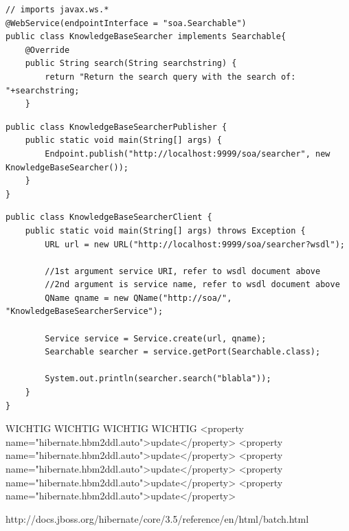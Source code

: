 \documentclass[12pt]{article}
\begin{document}
\begin{lstlisting}[caption=KnowledgeBaseSearcher class, label=KnowledgeBaseSearcher]
// imports javax.ws.*
@WebService(endpointInterface = "soa.Searchable")
public class KnowledgeBaseSearcher implements Searchable{
    @Override
    public String search(String searchstring) {
        return "Return the search query with the search of: "+searchstring;
    }
\end{lstlisting}
\begin{lstlisting}[caption=KnowledgeBaseSearcherPublisher class, label=KnowledgeBaseSearcherPublisher]
public class KnowledgeBaseSearcherPublisher {
    public static void main(String[] args) {
        Endpoint.publish("http://localhost:9999/soa/searcher", new KnowledgeBaseSearcher());
    }
}
\end{lstlisting}
\begin{lstlisting}[caption=KnowledgeBaseSearcherClient class, label=KnowledgeBaseSearcherClient]
public class KnowledgeBaseSearcherClient {
    public static void main(String[] args) throws Exception {
        URL url = new URL("http://localhost:9999/soa/searcher?wsdl");

        //1st argument service URI, refer to wsdl document above
        //2nd argument is service name, refer to wsdl document above
        QName qname = new QName("http://soa/", "KnowledgeBaseSearcherService");

        Service service = Service.create(url, qname);
        Searchable searcher = service.getPort(Searchable.class);

        System.out.println(searcher.search("blabla"));
    }
}
\end{lstlisting}

WICHTIG WICHTIG WICHTIG WICHTIG
		<property name="hibernate.hbm2ddl.auto">update</property>
		<property name="hibernate.hbm2ddl.auto">update</property>
		<property name="hibernate.hbm2ddl.auto">update</property>
		<property name="hibernate.hbm2ddl.auto">update</property>
		<property name="hibernate.hbm2ddl.auto">update</property>



http://docs.jboss.org/hibernate/core/3.5/reference/en/html/batch.html
\end{document}
